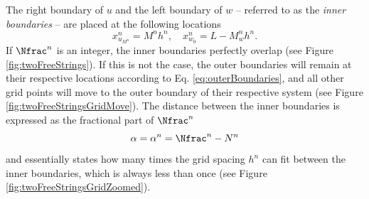 The right boundary of $u$ and the left boundary of $w$ -- referred to as the \textit{inner boundaries} -- are placed at the following locations 
\begin{equation}
    x_{u_{M^n}}^n = M^nh^n, \quad x_{w_{0}}^n = L-M_w^nh^n.
\end{equation}
If $\Nfrac^n$ is an integer, the inner boundaries perfectly overlap (see Figure \ref{fig:twoFreeStrings}). If this is not the case, the outer boundaries will remain at their respective locations according to Eq. \eqref{eq:outerBoundaries}, and all other grid points will move to the outer boundary of their respective system (see Figure \ref{fig:twoFreeStringsGridMove}). The distance between the inner boundaries is expressed as the fractional part of $\Nfrac^n$
\begin{equation}\label{eq:alphaDef}
    \alpha = \alpha^n = \Nfrac^n - N^n
\end{equation}
and essentially states how many times the grid spacing $h^n$ can fit between the inner boundaries, which is always less than once (see Figure \ref{fig:twoFreeStringsGridZoomed}).
\def\figwidth{0.9}
